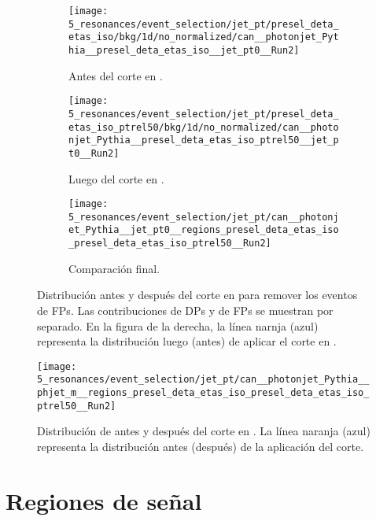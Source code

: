 \begin{figure}[ht!]
    \centering
    \begin{subfigure}[h]{0.32\linewidth}
        \centering
        \texttt{[image: 5\_resonances/event\_selection/jet\_pt/presel\_deta\_etas\_iso/bkg/1d/no\_normalized/can\_\_photonjet\_Pythia\_\_presel\_deta\_etas\_iso\_\_jet\_pt0\_\_Run2]}
        \caption{Antes del corte en \ptjet.}
    \end{subfigure}
    \hfill
    \begin{subfigure}[h]{0.32\linewidth}
        \centering
        \texttt{[image: 5\_resonances/event\_selection/jet\_pt/presel\_deta\_etas\_iso\_ptrel50/bkg/1d/no\_normalized/can\_\_photonjet\_Pythia\_\_presel\_deta\_etas\_iso\_ptrel50\_\_jet\_pt0\_\_Run2]}
        \caption{Luego del corte en \ptjet.}
    \end{subfigure}
    \hfill
    \begin{subfigure}[h]{0.32\linewidth}
        \centering
        \texttt{[image: 5\_resonances/event\_selection/jet\_pt/can\_\_photonjet\_Pythia\_\_jet\_pt0\_\_regions\_presel\_deta\_etas\_iso\_presel\_deta\_etas\_iso\_ptrel50\_\_Run2]}
        \caption{Comparación final.}
    \end{subfigure}
    \caption{Distribución antes y después del corte en \ptjet para remover los eventos de \acp{FP}. Las contribuciones de \acp{DP} y de \acp{FP} se muestran por separado. En la figura de la derecha, la línea narnja (azul) representa la distribución luego (antes) de aplicar el corte en \ptjet.}
    \label{fig:evt_selection:sr_opt:jet_pt:jet_pt}
\end{figure}



\begin{figure}[ht!]
    \centering
    \texttt{[image: 5\_resonances/event\_selection/jet\_pt/can\_\_photonjet\_Pythia\_\_phjet\_m\_\_regions\_presel\_deta\_etas\_iso\_presel\_deta\_etas\_iso\_ptrel50\_\_Run2]}
    \caption{Distribución de \myj antes y después del corte en \ptjet. La línea naranja (azul) representa la distribución antes (después) de la aplicación del corte.}
    \label{fig:evt_selection:sr_opt:jet_pt:phjet_m}
\end{figure}















\section{Regiones de señal}
\label{sec:evt_selection:sr}


